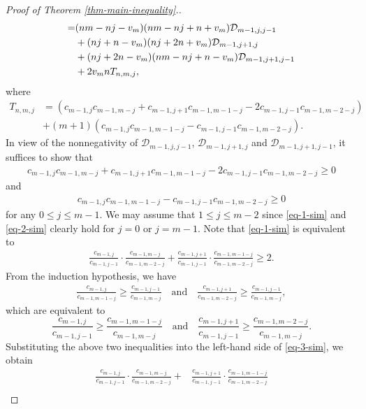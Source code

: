 \documentclass[12pt]{article}
\numberwithin{equation}{section}
\begin{document}
\begin{proof}[Proof of Theorem \ref{thm-main-inequality}.]
\begin{align}
       =& (nm-nj-v_m)(nm-nj+n+v_m)\mathcal{D}_{m-1,j,j-1} \notag \\ 
       &+(nj+n-v_m)(nj+2n+v_m)\mathcal{D}_{m-1,j+1,j} \notag\\ 
      &+(nj+2n-v_m)(nm-nj+n-v_m)\mathcal{D}_{m-1,j+1,j-1} \notag \\
      &+2v_mnT_{n,m,j}, \qquad \qquad \qquad ~~~\label{conj-1-inq-D}
 \end{align}
 where 
 \begin{align*}
   T_{n,m,j}&=(c_{m-1,j} c_{m-1,m-j}+c_{m-1,j+1}c_{m-1,m-1-j}-2c_{m-1,j-1}c_{m-1,m-2-j})\\
   &+(m+1)(c_{m-1,j}c_{m-1,m-1-j} -c_{m-1,j-1}c_{m-1,m-2-j}). 
 \end{align*}
In view of the nonnegativity of $\mathcal{D}_{m-1,j,j-1}$, $\mathcal{D}_{m-1,j+1,j}$ and $\mathcal{D}_{m-1,j+1,j-1}$, 
it suffices to show that 
\begin{align}\label{eq-1-sim}
c_{m-1,j} c_{m-1,m-j}+c_{m-1,j+1}c_{m-1,m-1-j}-2c_{m-1,j-1}c_{m-1,m-2-j}\ge 0
\end{align}
and
\begin{align}\label{eq-2-sim}
c_{m-1,j}c_{m-1,m-1-j} -c_{m-1,j-1}c_{m-1,m-2-j}\ge 0
\end{align}
for any $0 \leq j \leq m - 1$. We may assume that $1 \leq j \leq m - 2$ since \eqref{eq-1-sim} and \eqref{eq-2-sim} clearly hold for $j=0$ or $j=m-1$.
Note that \eqref{eq-1-sim} is equivalent to 
\begin{align}\label{eq-3-sim}
\frac{c_{m-1,j}}{c_{m-1,j-1}} \cdot \frac{c_{m-1,m-j}}{c_{m-1,m-2-j}}+\frac{c_{m-1,j+1}}{c_{m-1,j-1}}\cdot\frac{c_{m-1,m-1-j}}{c_{m-1,m-2-j}}\ge 2.
\end{align}
From the induction hypothesis, we have
\begin{align}\label{eq-3-sim-2}
\frac{c_{m-1,j}}{c_{m-1,m-1-j}}\ge \frac{c_{m-1,j-1}}{c_{m-1,m-j}} \quad \text{and} \quad 
\frac{c_{m-1,j+1}}{c_{m-1,m-2-j}}\ge\frac{c_{m-1,j-1}}{c_{m-1,m-j}},
\end{align}
which are equivalent to
$$\frac{c_{m-1,j}}{c_{m-1,j-1}}\ge \frac{c_{m-1,m-1-j}}{c_{m-1,m-j}} \quad \text{and}\quad
\frac{c_{m-1,j+1}}{c_{m-1,j-1}}\ge \frac{c_{m-1,m-2-j}}{c_{m-1,m-j}}.$$
Substituting the above two inequalities into the left-hand side of
\eqref{eq-3-sim}, we obtain
 \begin{align*}%
     \frac{c_{m-1,j}}{c_{m-1,j-1}}\cdot\frac{c_{m-1,m-j}}{c_{m-1,m-2-j}}+&\frac{c_{m-1,j+1}}{c_{m-1,j-1}}\cdot\frac{c_{m-1,m-1-j}}{c_{m-1,m-2-j}}
     \\[5pt]

\end{align*}
\end{proof}
\end{document}
